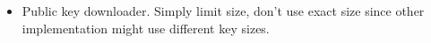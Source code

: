 \begin{itemize}
\begin{itemize}
    \end{itemize}
    
    \item Public key downloader. Simply limit size, don't use exact size since other implementation might use different key sizes.
    
    \end{itemize}
    
    
    

